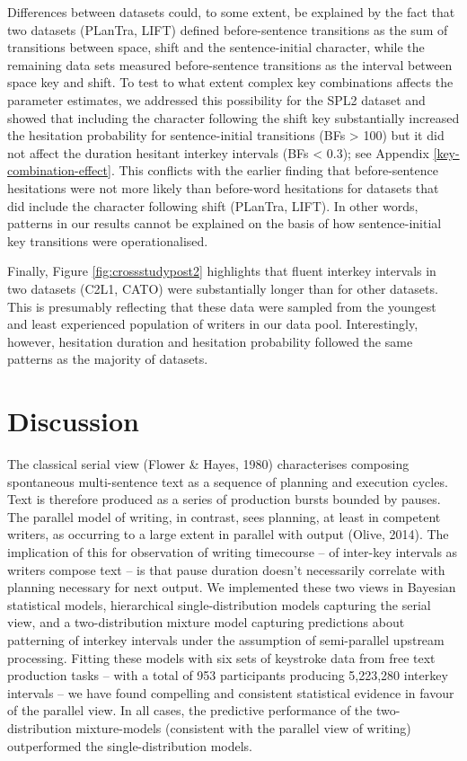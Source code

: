 \documentclass[
  man,floatsintext]{apa7}
\begin{document}
Differences between datasets could, to some extent, be explained by the fact that two datasets (PLanTra, LIFT) defined before-sentence transitions as the sum of transitions between space, shift and the sentence-initial character, while the remaining data sets measured before-sentence transitions as the interval between space key and shift. To test to what extent complex key combinations affects the parameter estimates, we addressed this possibility for the SPL2 dataset and showed that including the character following the shift key substantially increased the hesitation probability for sentence-initial transitions (BFs \textgreater{} 100) but it did not affect the duration hesitant interkey intervals (BFs \textless{} 0.3); see Appendix \ref{key-combination-effect}. This conflicts with the earlier finding that before-sentence hesitations were not more likely than before-word hesitations for datasets that did include the character following shift (PLanTra, LIFT). In other words, patterns in our results cannot be explained on the basis of how sentence-initial key transitions were operationalised.

Finally, Figure \ref{fig:crossstudypost2} highlights that fluent interkey intervals in two datasets (C2L1, CATO) were substantially longer than for other datasets. This is presumably reflecting that these data were sampled from the youngest and least experienced population of writers in our data pool. Interestingly, however, hesitation duration and hesitation probability followed the same patterns as the majority of datasets.

\hypertarget{discussion}{%
\section{Discussion}\label{discussion}}

The classical serial view (Flower \& Hayes, 1980) characterises composing spontaneous multi-sentence text as a sequence of planning and execution cycles. Text is therefore produced as a series of production bursts bounded by pauses. The parallel model of writing, in contrast, sees planning, at least in competent writers, as occurring to a large extent in parallel with output (Olive, 2014). The implication of this for observation of writing timecourse -- of inter-key intervals as writers compose text -- is that pause duration doesn't necessarily correlate with planning necessary for next output. We implemented these two views in Bayesian statistical models, hierarchical single-distribution models capturing the serial view, and a two-distribution mixture model capturing predictions about patterning of interkey intervals under the assumption of semi-parallel upstream processing. Fitting these models with six sets of keystroke data from free text production tasks -- with a total of 953 participants producing 5,223,280 interkey intervals -- we have found compelling and consistent statistical evidence in favour of the parallel view. In all cases, the predictive performance of the two-distribution mixture-models (consistent with the parallel view of writing) outperformed the single-distribution models.
\end{document}
